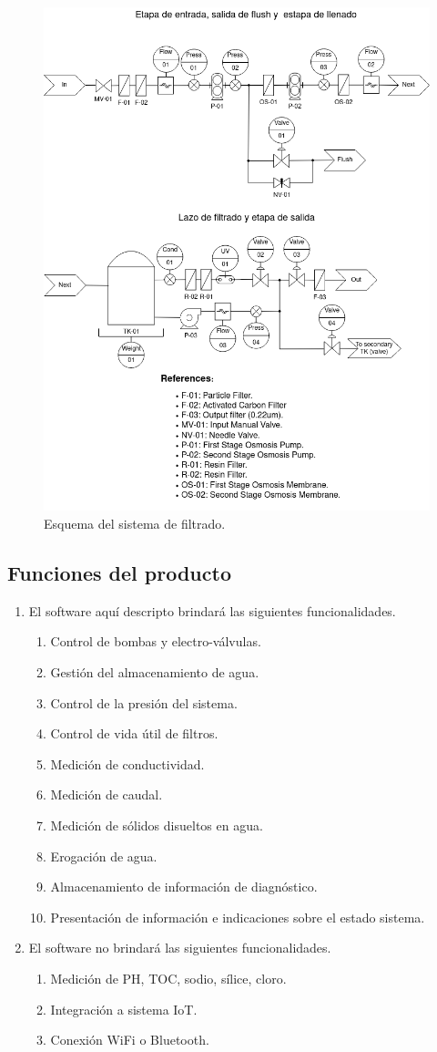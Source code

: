 \documentclass[
11pt, %
]{charter}
\begin{document}
\begin{figure}[!htb]
\centering 
\includegraphics[width=.7\textwidth]{./Figuras/Esquema de equipo_vert.png}
\caption{Esquema del sistema de filtrado.}
\label{fig:esquemaSistema}
\end{figure}

\newpage

\subsection{Funciones del producto}
\begin{enumerate}
	\item	El software aquí descripto brindará las siguientes funcionalidades.
	\begin{enumerate}
		\item 	Control de bombas y electro-válvulas.
		\item	Gestión del almacenamiento de agua.
		\item	Control de la presión del sistema.
		\item	Control de vida útil de filtros.
		\item	Medición de conductividad.
		\item	Medición de caudal.
		\item	Medición de sólidos disueltos en agua.
		\item	Erogación de agua.
		\item	Almacenamiento de información de diagnóstico.
		\item	Presentación de información e indicaciones sobre el estado sistema.
	\end{enumerate}
	\item	El software no brindará las siguientes funcionalidades.
	\begin{enumerate}
		\item	Medición de PH, TOC, sodio, sílice, cloro.
		\item	Integración a sistema IoT.
		\item	Conexión WiFi o Bluetooth.
	\end{enumerate}
\end{enumerate}
\end{document}
